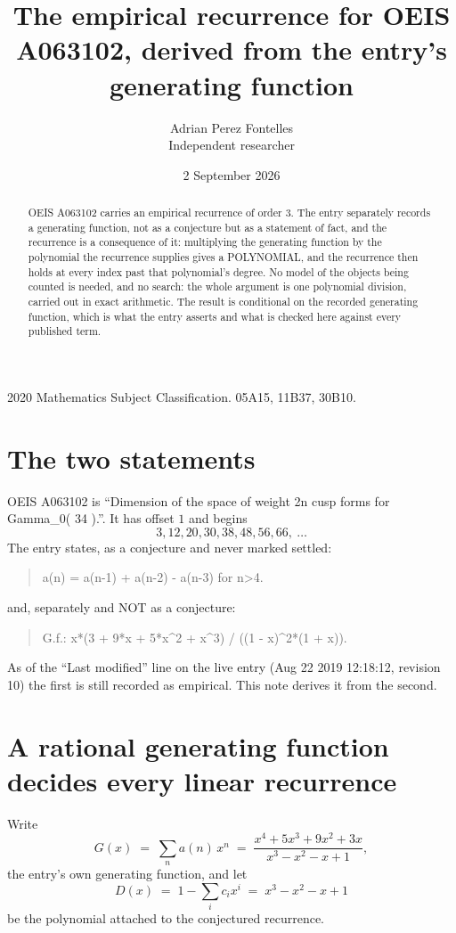 \documentclass[11pt,a4paper]{article}
\title{The empirical recurrence for OEIS A063102, derived from the entry's generating function}
\author{Adrian Perez Fontelles\\ \small Independent researcher}
\date{2 September 2026}
\theoremstyle{plain}
\theoremstyle{definition}
\begin{document}
\maketitle

\begin{abstract}
OEIS A063102 carries an empirical recurrence of order $3$. The entry separately records a
generating function, not as a conjecture but as a statement of fact, and the recurrence is a
consequence of it: multiplying the generating function by the polynomial the recurrence
supplies gives a POLYNOMIAL, and the recurrence then holds at every index past that
polynomial's degree. No model of the objects being counted is needed, and no search: the
whole argument is one polynomial division, carried out in exact arithmetic. The result is
conditional on the recorded generating function, which is what the entry asserts and what is
checked here against every published term.
\end{abstract}

\noindent\small 2020 Mathematics Subject Classification. 05A15, 11B37, 30B10.\normalsize

\section{The two statements}

OEIS A063102 is ``Dimension of the space of weight 2n cusp forms for Gamma\_0( 34 ).''. It has offset $1$ and begins
\[
3, 12, 20, 30, 38, 48, 56, 66,\ \dots
\]
The entry states, as a conjecture and never marked settled:
\begin{quote}
a(n) = a(n-1) + a(n-2) - a(n-3) for n>4.
\end{quote}
and, separately and NOT as a conjecture:
\begin{quote}
G.f.: x*(3 + 9*x + 5*x\^{}2 + x\^{}3) / ((1 - x)\^{}2*(1 + x)).
\end{quote}
As of the ``Last modified'' line on the live entry (Aug 22 2019 12:18:12, revision 10) the first is still
recorded as empirical. This note derives it from the second.

\section{A rational generating function decides every linear recurrence}

Write
\[
G(x)\;=\;\sum_{n}a(n)\,x^{n}\;=\;\frac{x^{4} + 5 x^{3} + 9 x^{2} + 3 x}{x^{3} - x^{2} - x + 1},
\]
the entry's own generating function, and let
\[
D(x)\;=\;1-\sum_i c_i x^{i}\;=\;x^{3} - x^{2} - x + 1
\]
be the polynomial attached to the conjectured recurrence.
\end{document}
